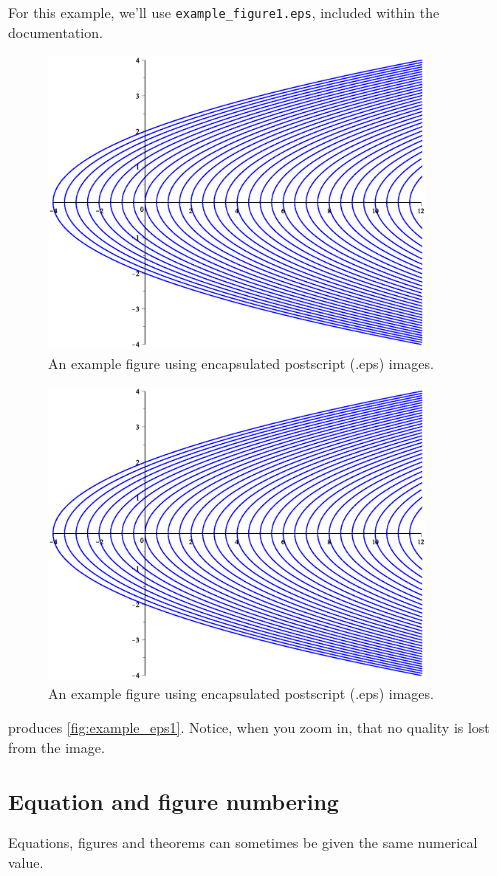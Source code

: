 For this example, we'll use \verb|example_figure1.eps|, included within the documentation.

\begin{spverbatim}
\begin{figure}[ht!]
\centering
\includegraphics[width=100mm]{Figures/example_figure1.eps}
\caption{An example figure using encapsulated postscript (.eps) images.}
\label{fig:example_eps1}
\end{figure}
\end{spverbatim}
\begin{figure}[ht!]
\centering
\includegraphics[width=100mm]{Figures/example_figure1.eps}
\caption{An example figure using encapsulated postscript (.eps) images.}
\label{fig:example_eps1}
\end{figure}
produces \autoref{fig:example_eps1}. Notice, when you zoom in, that no quality is lost from the image.

\subsection{Equation and figure numbering}
Equations, figures and theorems can sometimes be given the same numerical value.

